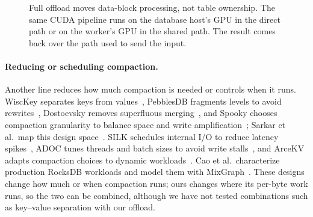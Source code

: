 \documentclass[sigconf, nonacm]{acmart}
\begin{document}
\begin{figure}[t]
  \centering
  \caption{Full offload moves data-block processing, not table ownership. The same CUDA
  pipeline runs on the database host's GPU in the direct path or on the worker's GPU in
  the shared path. The result comes back over the path used to send the input.}
  \label{fig:design}
\end{figure}

\paragraph{Reducing or scheduling compaction.}
Another line reduces how much compaction is needed or controls when it runs. WiscKey
separates keys from values~\cite{wisckey2016}, PebblesDB fragments levels to avoid
rewrites~\cite{pebblesdb2017}, Dostoevsky removes superfluous merging~\cite{dostoevsky2018},
and Spooky chooses compaction granularity to balance space and write
amplification~\cite{spooky2022}; Sarkar et al.\ map this design space~\cite{sarkar2021}.
SILK schedules internal I/O to reduce latency spikes~\cite{silk2019}, ADOC tunes threads and
batch sizes to avoid write stalls~\cite{adoc2023}, and ArceKV adapts compaction choices to
dynamic workloads~\cite{arcekv2026}. Cao et al.\ characterize production RocksDB workloads
and model them with MixGraph~\cite{cao2020}. These designs change how much or when compaction
runs; ours changes where its per-byte work runs, so the two can be combined, although we have
not tested combinations such as key--value separation with our offload.
\end{document}
